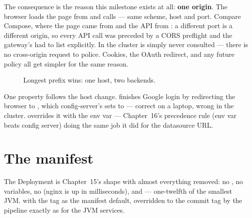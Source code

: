 The consequence is the reason this milestone exists at all:
\textbf{one origin}. The browser loads the page from
 and calls  ---
same scheme, host and port. Compare Compose, where the page came from
 and the API from : a
different port is a different origin, so every API call was preceded
by a CORS preflight and the gateway's  had to list
 explicitly. In the cluster 
is simply never consulted --- there is no cross-origin request to
police. Cookies, the OAuth redirect, and any future
 policy all get simpler for the same reason.

\begin{figure}[h]
\centering
{}
\caption{Longest prefix wins: one host, two backends.}
\end{figure}

One property follows the host change. 
finishes Google login by redirecting the browser to
, which config-server's
 sets to 
--- correct on a laptop, wrong in the cluster. 
overrides it with the env var
--- Chapter~16's precedence rule (env var beats config server) doing
the same job it did for the datasource URL.

\section{The manifest}

The Deployment is Chapter~15's shape with almost everything removed:
no , no  variables, no
 (nginx is up in milliseconds), and
 --- one-twelfth of the
smallest JVM.  with the
 tag as the manifest default, overridden to the commit
tag by the pipeline exactly as for the JVM services.

